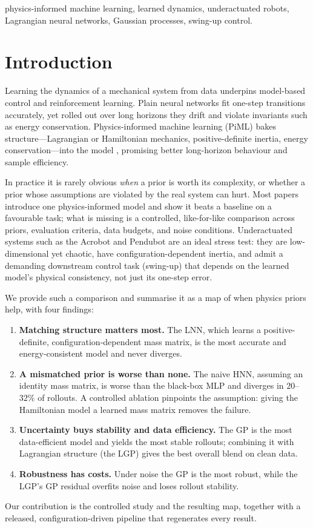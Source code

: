 \documentclass[conference]{IEEEtran}
\begin{document}
\begin{IEEEkeywords}
physics-informed machine learning, learned dynamics, underactuated robots,
Lagrangian neural networks, Gaussian processes, swing-up control.
\end{IEEEkeywords}

\section{Introduction}
Learning the dynamics of a mechanical system from data underpins model-based
control and reinforcement learning. Plain neural networks fit one-step
transitions accurately, yet rolled out over long horizons they drift and violate
invariants such as energy conservation. Physics-informed machine learning (PiML)
bakes structure---Lagrangian or Hamiltonian mechanics, positive-definite
inertia, energy conservation---into the model \cite{karniadakis2021,raissi2019},
promising better long-horizon behaviour and sample efficiency.

In practice it is rarely obvious \emph{when} a prior is worth its complexity, or
whether a prior whose assumptions are violated by the real system can hurt. Most
papers introduce one physics-informed model and show it beats a baseline on a
favourable task; what is missing is a controlled, like-for-like comparison across
priors, evaluation criteria, data budgets, and noise conditions. Underactuated
systems such as the Acrobot and Pendubot are an ideal stress test: they are
low-dimensional yet chaotic, have configuration-dependent inertia, and admit a
demanding downstream control task (swing-up) that depends on the learned model's
physical consistency, not just its one-step error.

We provide such a comparison and summarise it as a map of when physics priors
help, with four findings:
\begin{enumerate}
\item \textbf{Matching structure matters most.} The LNN, which learns a
positive-definite, configuration-dependent mass matrix, is the most accurate and
energy-consistent model and never diverges.
\item \textbf{A mismatched prior is worse than none.} The naive HNN, assuming an
identity mass matrix, is worse than the black-box MLP and diverges in
$20$--$32\%$ of rollouts. A controlled ablation pinpoints the assumption: giving
the Hamiltonian model a learned mass matrix removes the failure.
\item \textbf{Uncertainty buys stability and data efficiency.} The GP is the most
data-efficient model and yields the most stable rollouts; combining it with
Lagrangian structure (the LGP) gives the best overall blend on clean data.
\item \textbf{Robustness has costs.} Under noise the GP is the most robust, while
the LGP's GP residual overfits noise and loses rollout stability.
\end{enumerate}
Our contribution is the controlled study and the resulting map, together with a
released, configuration-driven pipeline that regenerates every result.
\end{document}
